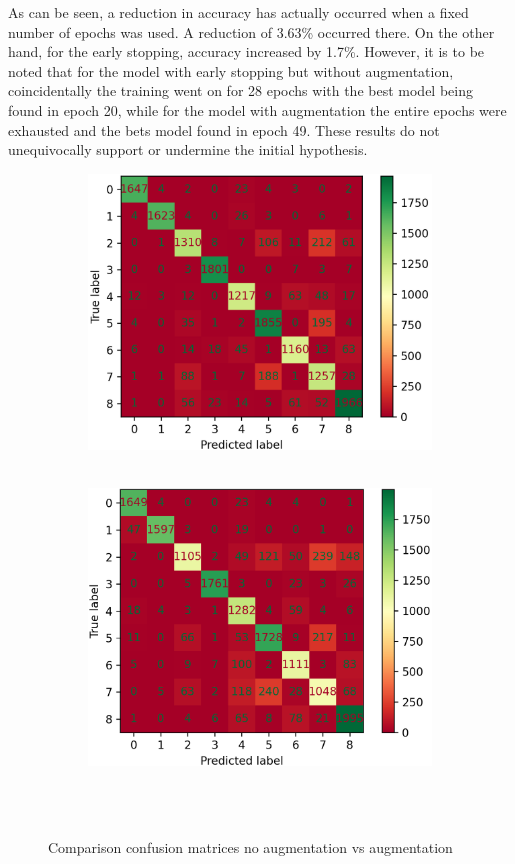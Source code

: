 As can be seen, a reduction in accuracy has actually occurred when a fixed number of epochs was used. A reduction of 3.63\% occurred there. On the other hand, for the early stopping, accuracy increased by 1.7\%. However, it is to be noted that for the model with early stopping but without augmentation, coincidentally the training went on for 28 epochs with the best model being found in epoch 20, while for the model with augmentation the entire epochs were exhausted and the bets model found in epoch 49. These results do not unequivocally support or undermine the initial hypothesis.
\begin{figure}[ht]
	\centering
	\begin{subfigure}{0.45\columnwidth}
		\includegraphics[width=\columnwidth]{./figures/Alex_420_with_balancing_conf_matrix_cropped.png}
		~\label{fig:noaugmentation}
	\end{subfigure} 
	\begin{subfigure}{0.45\columnwidth}
		\includegraphics[width=\columnwidth]{./figures/Alex_420_augment_conf_matrix_cropped.png}
		~\label{fig:augmentation}
	\end{subfigure}
	\caption{Comparison confusion matrices no augmentation vs augmentation}~\label{fig:augmenetationcombined}
\end{figure}
